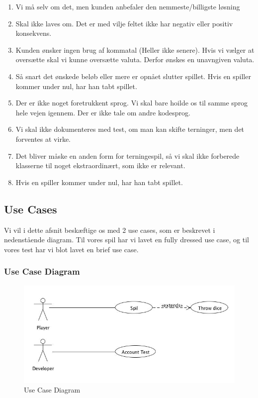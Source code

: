 \begin{enumerate}
\item Vi må selv om det, men kunden anbefaler den nemmeste/billigste løsning
\item Skal ikke laves om. Det er med vilje feltet ikke har negativ eller positiv konsekvens.
\item Kunden ønsker ingen brug af kommatal (Heller ikke senere). Hvis vi vælger at oversætte skal vi kunne oversætte valuta. Derfor ønskes en unavngiven valuta.
\item Så snart det ønskede beløb eller mere er opnået slutter spillet. Hvis en spiller kommer under nul, har han tabt spillet.
\item Der er ikke noget foretrukkent sprog. Vi skal bare hoilde os til samme sprog hele vejen igennem. Der er ikke tale om andre kodesprog.
\item Vi skal ikke dokumenteres med test, om man kan skifte terninger, men det forventes at virke.
\item Det bliver måske en anden form for terningespil, så vi skal ikke forberede klasserne til noget ekstraordinært, som ikke er relevant.
\item Hvis en spiller kommer under nul, har han tabt spillet.
\end{enumerate}
\subsection{Use Cases}
Vi vil i dette afsnit beskæftige os med 2 use cases, som er beskrevet i nedenstående diagram. Til vores spil har vi lavet en fully dressed use case, og til vores test har vi blot lavet en brief use case.
\subsubsection{Use Case Diagram}
\begin{figure}[ht]
\centering
\includegraphics[scale=0.5]{UseCaseDiagram.jpg}
\caption[<Text for the list of figures>]{Use Case Diagram}
\label{fig:figure 2}
\end{figure}
\newpage
